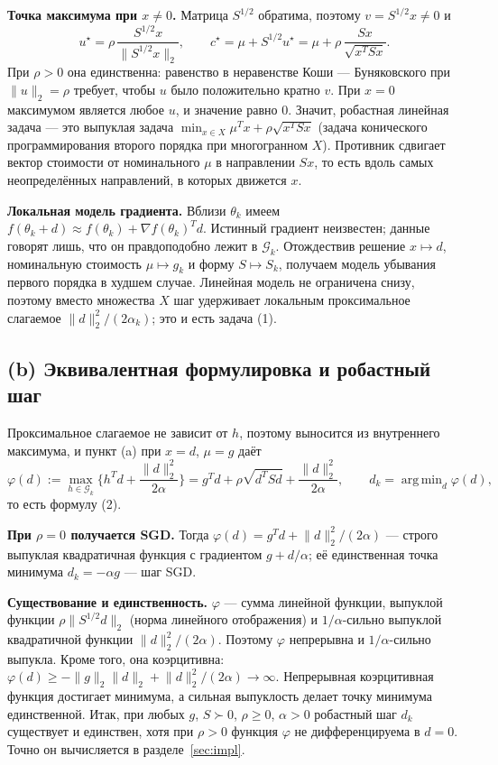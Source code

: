 \documentclass[11pt,a4paper]{article}
\newcommand{\G}{\mathcal{G}_k}
\newcommand{\norm}[1]{\lVert #1\rVert_2}
\DeclareMathOperator*{\argmin}{arg\,min}
\begin{document}
\textbf{Точка максимума при $x\ne0$.} Матрица $S^{1/2}$ обратима, поэтому $v=S^{1/2}x\ne0$ и
\begin{equation*}
u^\star=\rho\,\frac{S^{1/2}x}{\norm{S^{1/2}x}},\qquad
c^\star=\mu+S^{1/2}u^\star=\mu+\rho\,\frac{Sx}{\sqrt{x^TSx}} .
\end{equation*}
При $\rho>0$ она единственна: равенство в неравенстве Коши — Буняковского при $\norm u=\rho$
требует, чтобы $u$ было положительно кратно $v$. При $x=0$ максимумом является любое $u$, и
значение равно $0$. Значит, робастная линейная задача — это выпуклая задача
$\min_{x\in X}\mu^Tx+\rho\sqrt{x^TSx}$ (задача конического программирования второго порядка
при многогранном $X$). Противник сдвигает вектор стоимости от номинального $\mu$ в направлении
$Sx$, то есть вдоль самых неопределённых направлений, в которых движется $x$.

\textbf{Локальная модель градиента.} Вблизи $\theta_k$ имеем
$f(\theta_k+d)\approx f(\theta_k)+\nabla f(\theta_k)^Td$. Истинный градиент неизвестен; данные
говорят лишь, что он правдоподобно лежит в $\G$. Отождествив решение $x\mapsto d$, номинальную
стоимость $\mu\mapsto g_k$ и форму $S\mapsto S_k$, получаем модель убывания первого порядка в
худшем случае. Линейная модель не ограничена снизу, поэтому вместо множества $X$ шаг удерживает
локальным проксимальное слагаемое $\norm d^2/(2\alpha_k)$; это и есть задача (1).

\subsection{(b) Эквивалентная формулировка и робастный шаг}

Проксимальное слагаемое не зависит от $h$, поэтому выносится из внутреннего максимума, и пункт (a)
при $x=d$, $\mu=g$ даёт
\begin{equation*}
\varphi(d):=\max_{h\in\G}\Big\{h^Td+\frac{\norm d^2}{2\alpha}\Big\}
=g^Td+\rho\sqrt{d^TSd}+\frac{\norm d^2}{2\alpha},\qquad d_k=\argmin_d\varphi(d),
\end{equation*}
то есть формулу (2).

\textbf{При $\rho=0$ получается SGD.} Тогда $\varphi(d)=g^Td+\norm d^2/(2\alpha)$ — строго выпуклая
квадратичная функция с градиентом $g+d/\alpha$; её единственная точка минимума $d_k=-\alpha g$ —
шаг SGD.

\textbf{Существование и единственность.} $\varphi$ — сумма линейной функции, выпуклой функции
$\rho\norm{S^{1/2}d}$ (норма линейного отображения) и $1/\alpha$-сильно выпуклой квадратичной
функции $\norm d^2/(2\alpha)$. Поэтому $\varphi$ непрерывна и $1/\alpha$-сильно выпукла. Кроме
того, она коэрцитивна: $\varphi(d)\ge-\norm g\norm d+\norm d^2/(2\alpha)\to\infty$. Непрерывная
коэрцитивная функция достигает минимума, а сильная выпуклость делает точку минимума
единственной. Итак, при любых $g$, $S\succ0$, $\rho\ge0$, $\alpha>0$ робастный шаг $d_k$ существует
и единствен, хотя при $\rho>0$ функция $\varphi$ не дифференцируема в $d=0$. Точно он вычисляется в
разделе~\ref{sec:impl}.
\end{document}

